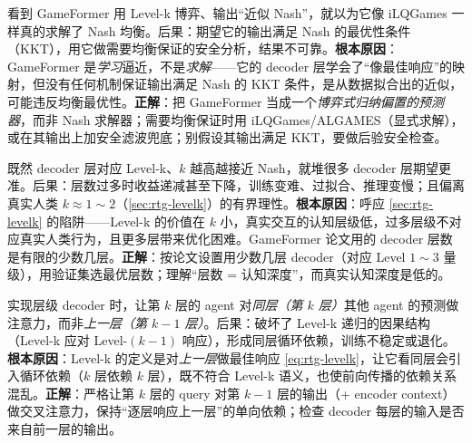 \begin{pitfall}
看到 GameFormer 用 Level-k 博弈、输出“近似 Nash”，就以为它像 iLQGames 一样真的求解了 Nash 均衡。后果：期望它的输出满足 Nash 的最优性条件（KKT），用它做需要均衡保证的安全分析，结果不可靠。\textbf{根本原因}：GameFormer 是\emph{学习}逼近，不是\emph{求解}——它的 decoder 层学会了“像最佳响应”的映射，但没有任何机制保证输出满足 Nash 的 KKT 条件，是从数据拟合出的近似，可能违反均衡最优性。\textbf{正解}：把 GameFormer 当成一个\emph{博弈式归纳偏置的预测器}，而非 Nash 求解器；需要均衡保证时用 iLQGames/ALGAMES（显式求解），或在其输出上加安全滤波兜底；别假设其输出满足 KKT，要做后验安全检查。
\end{pitfall}

\begin{pitfall}
既然 decoder 层对应 Level-k、$k$ 越高越接近 Nash，就堆很多 decoder 层期望更准。后果：层数过多时收益递减甚至下降，训练变难、过拟合、推理变慢；且偏离真实人类 $k\approx1\sim2$（\cref{sec:rtg-levelk}）的有界理性。\textbf{根本原因}：呼应 \cref{sec:rtg-levelk} 的陷阱——Level-k 的价值在 $k$ 小，真实交互的认知层级低，过多层级不对应真实人类行为，且更多层带来优化困难。GameFormer 论文用的 decoder 层数是有限的少数几层。\textbf{正解}：按论文设置用少数几层 decoder（对应 Level $1\sim3$ 量级），用验证集选最优层数；理解“层数 = 认知深度”，而真实认知深度是低的。
\end{pitfall}

\begin{pitfall}
实现层级 decoder 时，让第 $k$ 层的 agent 对\emph{同层（第 $k$ 层）}其他 agent 的预测做注意力，而非\emph{上一层（第 $k-1$ 层）}。后果：破坏了 Level-k 递归的因果结构（Level-k 应对 Level-$(k-1)$ 响应），形成同层循环依赖，训练不稳定或退化。\textbf{根本原因}：Level-k 的定义是对\emph{上一层}做最佳响应 \cref{eq:rtg-levelk}，让它看同层会引入循环依赖（$k$ 层依赖 $k$ 层），既不符合 Level-k 语义，也使前向传播的依赖关系混乱。\textbf{正解}：严格让第 $k$ 层的 query 对第 $k-1$ 层的输出（+ encoder context）做交叉注意力，保持“逐层响应上一层”的单向依赖；检查 decoder 每层的输入是否来自前一层的输出。
\end{pitfall}

